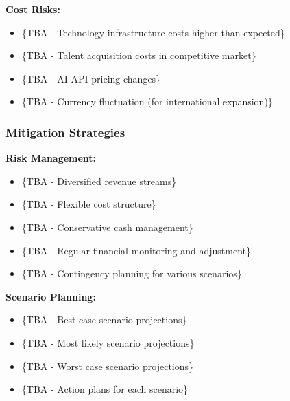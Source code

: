 \textbf{Cost Risks:}
\begin{itemize}
    \item \{TBA - Technology infrastructure costs higher than expected\}
    \item \{TBA - Talent acquisition costs in competitive market\}
    \item \{TBA - AI API pricing changes\}
    \item \{TBA - Currency fluctuation (for international expansion)\}
\end{itemize}

\subsubsection{Mitigation Strategies}
\textbf{Risk Management:}
\begin{itemize}
    \item \{TBA - Diversified revenue streams\}
    \item \{TBA - Flexible cost structure\}
    \item \{TBA - Conservative cash management\}
    \item \{TBA - Regular financial monitoring and adjustment\}
    \item \{TBA - Contingency planning for various scenarios\}
\end{itemize}

\textbf{Scenario Planning:}
\begin{itemize}
    \item \{TBA - Best case scenario projections\}
    \item \{TBA - Most likely scenario projections\}
    \item \{TBA - Worst case scenario projections\}
    \item \{TBA - Action plans for each scenario\}
\end{itemize}